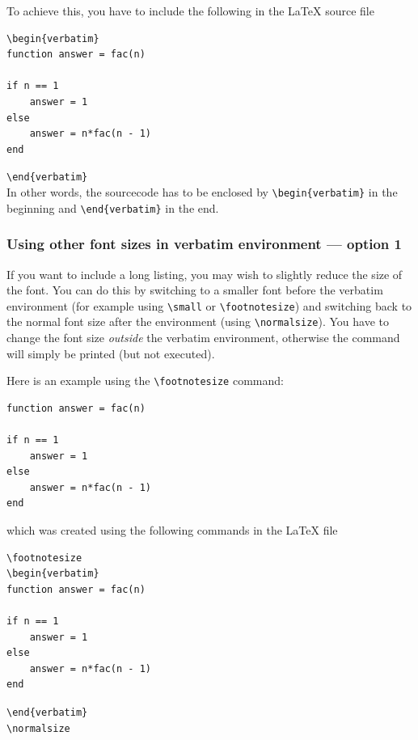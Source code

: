 \documentclass[12pt,a4paper]{article}
\begin{document}
To achieve this, you have to include the following in the \LaTeX{}
source file
\begin{verbatim}
\begin{verbatim}
function answer = fac(n)

if n == 1
    answer = 1
else
    answer = n*fac(n - 1)
end\end{verbatim}\verb:\end{verbatim}:\\ 
                                         

In other words, the sourcecode has to be enclosed by
\verb:\begin{verbatim}: in the beginning and \verb:\end{verbatim}: in
the end.

\subsubsection{Using other font sizes in verbatim environment ---
  option 1}


If you want to include a long listing, you may wish to slightly reduce
the size of the font. You can do this by switching to a smaller font
before the verbatim environment (for example using \verb:\small: or
\verb:\footnotesize:) and switching back to the normal font size after
the environment (using \verb:\normalsize:). You have to change the
font size \emph{outside} the verbatim environment, otherwise the
command will simply be printed (but not executed).

Here is an example using the \verb:\footnotesize: command:
\footnotesize
\begin{verbatim}
function answer = fac(n)

if n == 1
    answer = 1
else
    answer = n*fac(n - 1)
end
\end{verbatim}
\normalsize

which was created using the following commands in the \LaTeX{} file

\begin{verbatim}
\footnotesize
\begin{verbatim}
function answer = fac(n)

if n == 1
    answer = 1
else
    answer = n*fac(n - 1)
end\end{verbatim}\verb:\end{verbatim}:\\ 
\verb:\normalsize:
\end{document}
